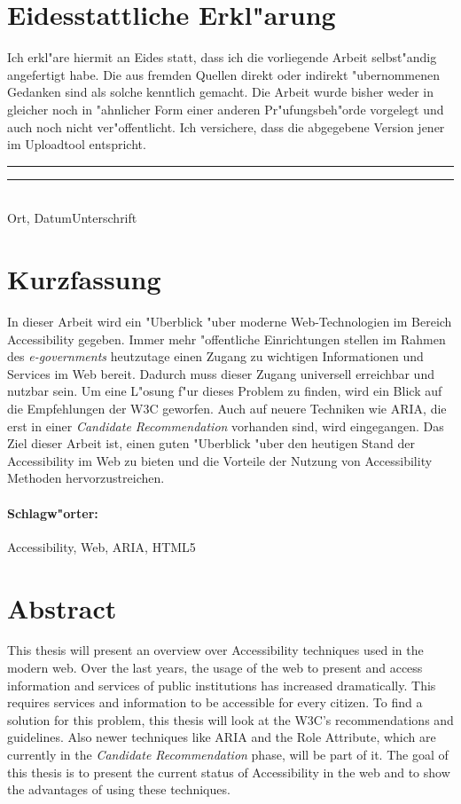 \documentclass[a4paper,bibtotoc,oneside]{scrbook}
\begin{document}
\newpage


\section*{Eidesstattliche Erkl"arung}\thispagestyle{empty}
\glqq Ich erkl"are hiermit an Eides statt, dass ich die vorliegende Arbeit selbst"andig angefertigt habe. 
Die aus fremden Quellen direkt oder indirekt "ubernommenen Gedanken sind als solche kenntlich gemacht. 
Die Arbeit wurde bisher weder in gleicher noch in "ahnlicher Form einer anderen Pr"ufungsbeh"orde vorgelegt
und auch noch nicht ver"offentlicht. Ich versichere, dass die abgegebene Version jener im Uploadtool entspricht.\grqq\\[5\baselineskip]
\rule{5cm}{0.2pt}\hfill\rule{5cm}{0.2pt}\\
\phantom{Datum }Ort, Datum\hfill Unterschrift\hspace{15mm}

\newpage


\section*{Kurzfassung}\thispagestyle{empty}
In dieser Arbeit wird ein "Uberblick "uber moderne Web-Technologien im Bereich
Accessibility gegeben. Immer mehr "offentliche Einrichtungen stellen im Rahmen des \emph{e-governments} heutzutage einen Zugang zu wichtigen Informationen und Services im Web bereit. Dadurch muss dieser Zugang universell erreichbar und nutzbar sein. Um eine L"osung f"ur dieses Problem zu finden, wird ein Blick auf die Empfehlungen der W3C geworfen. Auch auf neuere Techniken wie ARIA, die erst in einer \emph{Candidate Recommendation} vorhanden sind, wird eingegangen. Das Ziel dieser Arbeit ist, einen guten "Uberblick "uber den heutigen Stand der Accessibility im Web zu bieten und die Vorteile der Nutzung von Accessibility Methoden hervorzustreichen. 
\vfill
\paragraph*{Schlagw"orter:} Accessibility, Web, ARIA, HTML5


\newpage

\section*{Abstract}\thispagestyle{empty}
This thesis will present an overview over Accessibility techniques used in the
modern web. Over the last years, the usage of the web to present and
access information and services of public institutions has increased
dramatically. This requires services and information to be accessible for
every citizen. To find a solution for this problem, this thesis will look at
the W3C's recommendations and guidelines. Also newer techniques like ARIA
and the Role Attribute, which are currently in the \emph{Candidate Recommendation} phase, will be part of it. The goal of this thesis is to present the current status of Accessibility in the web and to show the advantages of using these techniques.
\vfill
\end{document}
